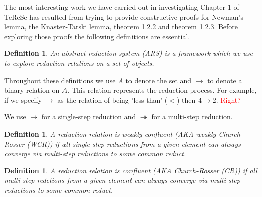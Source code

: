 \documentclass{scrartcl}
\newcommand{\tto}{\twoheadrightarrow}
\newtheorem{dfn}[thm]{Definition}
\begin{document}
The most interesting work we have carried out in investigating Chapter 1 of TeReSe has resulted from trying to provide constructive proofs for Newman's lemma, the Knaster-Tarski lemma, theorem 1.2.2 and theorem 1.2.3. Before exploring those proofs the following definitions are essential.
\begin{dfn}
  An abstract reduction system (\emph{ARS}) is a framework which we use to explore reduction relations on a set of objects.
\end{dfn}
Throughout these definitions we use $A$ to denote the set and $\to$ to denote a binary relation on $A$. This relation represents the reduction process. For example, if we specify $\to$ as the relation of being 'less than' ($<$) then $4 \to 2$. \textcolor{red}{Right?}

We use $\to$ for a single-step reduction and $\tto$ for a multi-step reduction.

\begin{dfn}
    A reduction relation is \emph{weakly confluent} (AKA weakly Church-Rosser (WCR)) if all single-step reductions from a given element can always converge via multi-step reductions to some common reduct.
\end{dfn}
\begin{center}
\end{center}

\begin{dfn}
    A reduction relation is \emph{confluent} (AKA Church-Rosser (CR)) if all multi-step redctions from a given element can always converge via multi-step reductions to some common reduct.
\end{dfn}
\begin{center}
\end{center}
\end{document}
